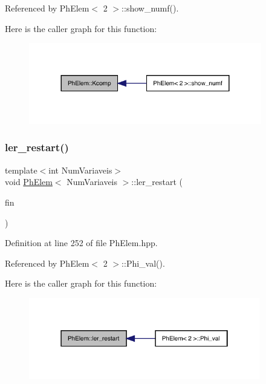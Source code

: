 Referenced by Ph\+Elem$<$ 2 $>$\+::show\+\_\+numf().

Here is the caller graph for this function\+:
\nopagebreak
\begin{figure}[H]
\begin{center}
\leavevmode
\includegraphics[width=288pt]{classPhElem_afdbe06fb407dc4c474b886ed219de195_icgraph}
\end{center}
\end{figure}
\mbox{\label{classPhElem_a0209eb7e6db7b0b541b51c46269ee9b6}} 
\subsubsection{\texorpdfstring{ler\+\_\+restart()}{ler\_restart()}}
{\footnotesize\ttfamily template$<$int Num\+Variaveis$>$ \\
void \hyperlink{classPhElem}{Ph\+Elem}$<$ Num\+Variaveis $>$\+::ler\+\_\+restart (\begin{DoxyParamCaption}\item[{F\+I\+LE $\ast$}]{fin }\end{DoxyParamCaption})}



Definition at line 252 of file Ph\+Elem.\+hpp.



Referenced by Ph\+Elem$<$ 2 $>$\+::\+Phi\+\_\+val().

Here is the caller graph for this function\+:
\nopagebreak
\begin{figure}[H]
\begin{center}
\leavevmode
\includegraphics[width=286pt]{classPhElem_a0209eb7e6db7b0b541b51c46269ee9b6_icgraph}
\end{center}
\end{figure}
\mbox{\label{classPhElem_ad0a2992e6d206b6a351da8847a9dd69a}} 
